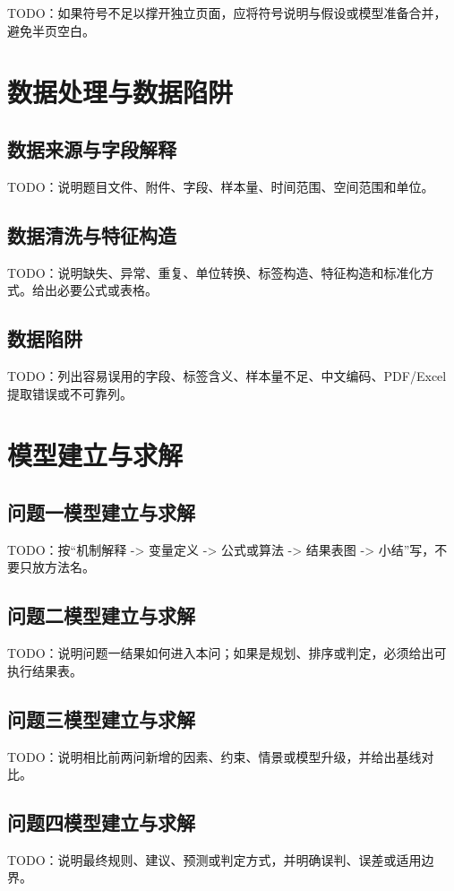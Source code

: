 \documentclass{ctexart}
\begin{document}
TODO：如果符号不足以撑开独立页面，应将符号说明与假设或模型准备合并，避免半页空白。

\section{数据处理与数据陷阱}

\subsection{数据来源与字段解释}
TODO：说明题目文件、附件、字段、样本量、时间范围、空间范围和单位。

\subsection{数据清洗与特征构造}
TODO：说明缺失、异常、重复、单位转换、标签构造、特征构造和标准化方式。给出必要公式或表格。

\subsection{数据陷阱}
TODO：列出容易误用的字段、标签含义、样本量不足、中文编码、PDF/Excel 提取错误或不可靠列。

\section{模型建立与求解}

\subsection{问题一模型建立与求解}
TODO：按“机制解释 -> 变量定义 -> 公式或算法 -> 结果表图 -> 小结”写，不要只放方法名。

\subsection{问题二模型建立与求解}
TODO：说明问题一结果如何进入本问；如果是规划、排序或判定，必须给出可执行结果表。

\subsection{问题三模型建立与求解}
TODO：说明相比前两问新增的因素、约束、情景或模型升级，并给出基线对比。

\subsection{问题四模型建立与求解}
TODO：说明最终规则、建议、预测或判定方式，并明确误判、误差或适用边界。
\end{document}
